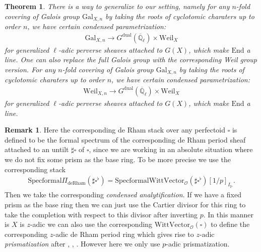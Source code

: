 \documentclass[12pt]{article}
\newtheorem{theorem}{Theorem}
\theoremstyle{definition}
\newtheorem{remark}{Remark}
\begin{document}
\begin{theorem}
There is a way to generalize \cite{FS} to our setting, namely for any $n$-fold covering of Galois group $\mathrm{Gal}_{X,n}$ by taking the roots of cyclotomic charaters up to order $n$, we have certain condensed parametrization:
\begin{align}
\mathrm{Gal}_{X,n} \rightarrow G^\mathrm{dual}(\overline{\mathbb{Q}}_\ell)\times \mathrm{Weil}_X
\end{align}
for generalized $\ell$-adic perverse sheaves attached to $G(X)$, which make $\mathrm{End}$ a line. One can also replace the full Galois group with the corresponding Weil group version. For any $n$-fold covering of Galois group $\mathrm{Gal}_{X,n}$ by taking the roots of cyclotomic charaters up to order $n$, we have certain condensed parametrization:
\begin{align}
\mathrm{Weil}_{X,n} \rightarrow G^\mathrm{dual}(\overline{\mathbb{Q}}_\ell)\times \mathrm{Weil}_X
\end{align}
for generalized $\ell$-adic perverse sheaves attached to $G(X)$, which make $\mathrm{End}$ a line. 
\end{theorem}

\begin{remark}
Here the corresponding de Rham stack over any perfectoid $\square$ is defined to be the formal spectrum of the corresponding de Rham period sheaf attached to an untilt $\sharp\square$ of $\square$, since we are working in an absolute situation where we do not fix some prism as the base ring. To be more precise we use the corresponding stack 
\begin{align}
\mathrm{Specformal}\Pi_\mathrm{deRham}(\sharp\square^\flat)=\mathrm{Specformal}\mathrm{WittVector}_\mathcal{O}(\sharp\square^\flat)[1/p]_{I_{\sharp\square}}. 
\end{align}
Then we take the corresponding \textit{condensed analytification}. If we have a fixed prism as the base ring then we can just use the Cartier divisor for this ring to take the completion with respect to this divisor after inverting $p$. In this manner is $X$ is $z$-adic we can also use the corresponding $\mathrm{WittVector}_\mathcal{O}(\square)$ to define the corresponding $z$-adic de Rham period ring which gives rise to $z$-adic \textit{prismatization} after \cite{BS2}, \cite{BLA}, \cite{DC}. However here we only use $p$-adic prismatization.
\end{remark}



\newpage
\end{document}
